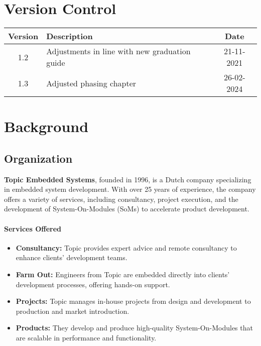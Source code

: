 \documentclass{article}
\begin{document}
\newpage

\section*{Version Control}

\begin{tabular}{|c|l|c|}
    \hline
    Version & Description & Date \\
    \hline
    1.2 & Adjustments in line with new graduation guide & 21-11-2021 \\
    1.3 & Adjusted phasing chapter & 26-02-2024 \\
    \hline
\end{tabular}

\newpage

\tableofcontents

\newpage
\section{Background}


\subsection{Organization}
\textbf{Topic Embedded Systems}, founded in 1996, is a Dutch company
specializing in embedded system development. With over 25 years of experience,
the company offers a variety of services, including consultancy, project
execution, and the development of System-On-Modules (SoMs) to accelerate product
development.

\paragraph{Services Offered} 
\begin{itemize} 
    \item \textbf{Consultancy:} Topic
provides expert advice and remote consultancy to enhance clients' development
teams. 
\item \textbf{Farm Out:} Engineers from Topic are embedded directly into
clients' development processes, offering hands-on support. 
\item \textbf{Projects:} Topic manages in-house projects from design and development
to production and market introduction. 
\item \textbf{Products:} They develop and
produce high-quality System-On-Modules that are scalable in performance and
functionality. \end{itemize}
\end{document}
